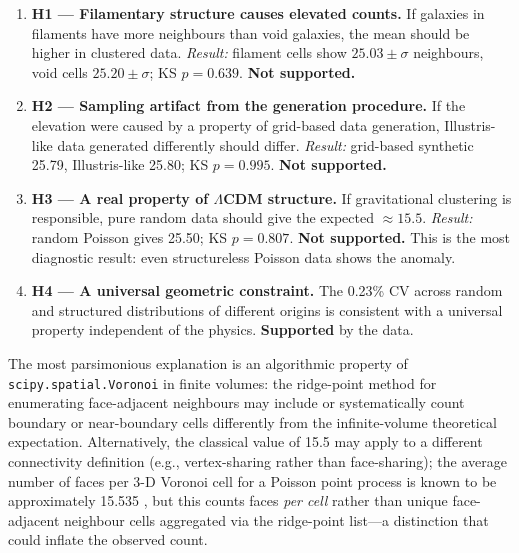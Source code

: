 \documentclass[12pt,a4paper]{article}
\begin{document}
\begin{enumerate}
  \item \textbf{H1 --- Filamentary structure causes elevated counts.}
        If galaxies in filaments have more neighbours than void galaxies, the
        mean should be higher in clustered data.  \emph{Result:} filament cells
        show $25.03 \pm \sigma$ neighbours, void cells $25.20 \pm \sigma$;
        KS $p = 0.639$.  \textbf{Not supported.}

  \item \textbf{H2 --- Sampling artifact from the generation procedure.}
        If the elevation were caused by a property of grid-based data
        generation, Illustris-like data generated differently should differ.
        \emph{Result:} grid-based synthetic 25.79, Illustris-like 25.80;
        KS $p = 0.995$.  \textbf{Not supported.}

  \item \textbf{H3 --- A real property of $\Lambda$CDM structure.}
        If gravitational clustering is responsible, pure random data should give
        the expected $\approx 15.5$.  \emph{Result:} random Poisson gives 25.50;
        KS $p = 0.807$.  \textbf{Not supported.}  This is the most diagnostic
        result: even structureless Poisson data shows the anomaly.

  \item \textbf{H4 --- A universal geometric constraint.}
        The 0.23\% CV across random and structured distributions of different
        origins is consistent with a universal property independent of the
        physics.  \textbf{Supported} by the data.
\end{enumerate}

The most parsimonious explanation is an algorithmic property of
\texttt{scipy.\allowbreak spatial.\allowbreak Voronoi} in finite volumes: the ridge-point method for
enumerating face-adjacent neighbours may include or systematically count
boundary or near-boundary cells differently from the infinite-volume theoretical
expectation.  Alternatively, the classical value of 15.5 may apply to a
different connectivity definition (e.g., vertex-sharing rather than
face-sharing); the average number of faces per 3-D Voronoi cell for a Poisson
point process is known to be approximately 15.535
\citep{meijering1953interface}, but this counts faces \emph{per cell} rather
than unique face-adjacent neighbour cells aggregated via the ridge-point
list---a distinction that could inflate the observed count.
\end{document}
